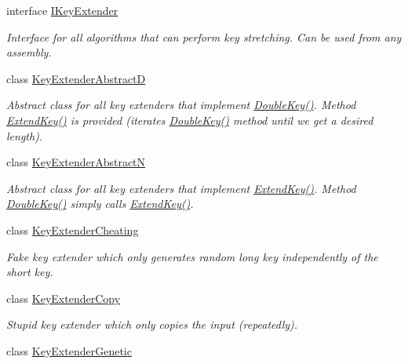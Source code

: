 \begin{DoxyCompactItemize}
interface \hyperlink{interface_crypto_1_1_i_key_extender}{I\+Key\+Extender}
\begin{DoxyCompactList}\small\item\em Interface for all algorithms that can perform key stretching. Can be used from any assembly. \end{DoxyCompactList}\item 
class \hyperlink{class_crypto_1_1_key_extender_abstract_d}{Key\+Extender\+Abstract\+D}
\begin{DoxyCompactList}\small\item\em Abstract class for all key extenders that implement \hyperlink{class_crypto_1_1_key_extender_abstract_d_ae403b92e9038b9c0bc7a21885e24ffc7}{Double\+Key()}. Method \hyperlink{class_crypto_1_1_key_extender_abstract_d_a3ec7fa96f391d840043eff0c8409d130}{Extend\+Key()} is provided (iterates \hyperlink{class_crypto_1_1_key_extender_abstract_d_ae403b92e9038b9c0bc7a21885e24ffc7}{Double\+Key()} method until we get a desired length). \end{DoxyCompactList}\item 
class \hyperlink{class_crypto_1_1_key_extender_abstract_n}{Key\+Extender\+Abstract\+N}
\begin{DoxyCompactList}\small\item\em Abstract class for all key extenders that implement \hyperlink{class_crypto_1_1_key_extender_abstract_n_a9df4156ad0a84730f87119e5a25cf1ef}{Extend\+Key()}. Method \hyperlink{class_crypto_1_1_key_extender_abstract_n_a57e9a8247ebde9e639c16107c2961d10}{Double\+Key()} simply calls \hyperlink{class_crypto_1_1_key_extender_abstract_n_a9df4156ad0a84730f87119e5a25cf1ef}{Extend\+Key()}. \end{DoxyCompactList}\item 
class \hyperlink{class_crypto_1_1_key_extender_cheating}{Key\+Extender\+Cheating}
\begin{DoxyCompactList}\small\item\em Fake key extender which only generates random long key independently of the short key. \end{DoxyCompactList}\item 
class \hyperlink{class_crypto_1_1_key_extender_copy}{Key\+Extender\+Copy}
\begin{DoxyCompactList}\small\item\em Stupid key extender which only copies the input (repeatedly). \end{DoxyCompactList}\item 
class \hyperlink{class_crypto_1_1_key_extender_genetic}{Key\+Extender\+Genetic}

\end{DoxyCompactItemize}
